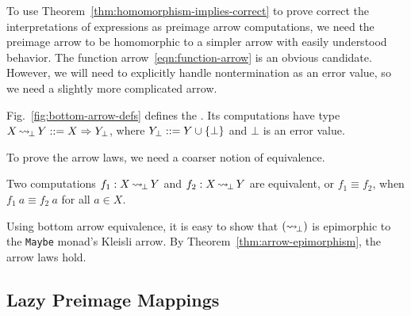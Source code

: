 \documentclass{llncs}
\newcommand{\figref}[1]{Fig.~\ref{#1}}
\newcommand{\arrow}{\rightsquigarrow}
\DeclareMathOperator{\botto}{\arrow_{\mspace{-3mu}\bot}}
\begin{document}
To use Theorem~\ref{thm:homomorphism-implies-correct} to prove correct the interpretations of expressions as preimage arrow computations, we need the preimage arrow to be homomorphic to a simpler arrow with easily understood behavior.
The function arrow~\eqref{eqn:function-arrow} is an obvious candidate.
However, we will need to explicitly handle nontermination as an error value, so we need a slightly more complicated arrow.

\figref{fig:bottom-arrow-defs} defines the .
Its computations have type $X \botto Y ::= X \tto Y_\bot$, where $Y_\bot ::= Y \cup \{{\bot}\}$ and $\bot$ is an error value.

To prove the arrow laws, we need a coarser notion of equivalence.

\begin{definition}
Two computations $f_1 : X \botto Y$ and $f_2 : X \botto Y$ are equivalent, or $f_1 \equiv f_2$, when $f_1~a \equiv f_2~a$ for all $a \in X$.
\end{definition}

Using bottom arrow equivalence, it is easy to show that $(\botto)$ is epimorphic to the \texttt{Maybe} monad's Kleisli arrow.
By Theorem~\ref{thm:arrow-epimorphism}, the arrow laws hold.

\subsection{Lazy Preimage Mappings}
\label{sec:lazy-preimage-mappings}
\end{document}
